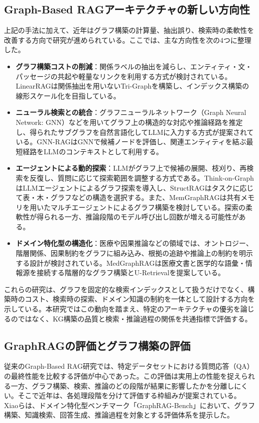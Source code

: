 \documentclass[a4j,dvipdfmx]{jsarticle}
\begin{document}
\subsection{Graph-Based RAGアーキテクチャの新しい方向性}
上記の手法に加えて、近年はグラフ構築の計算量、抽出誤り、検索時の柔軟性を改善する方向で研究が進められている\cite{pan2024unifying}。ここでは、主な方向性を次の4つに整理した。
\begin{itemize}
    \item \textbf{グラフ構築コストの削減}：関係ラベルの抽出を減らし、エンティティ・文・パッセージの共起や軽量なリンクを利用する方式が検討されている。LinearRAGは関係抽出を用いないTri-Graphを構築し、インデックス構築の線形スケール化を目指している\cite{zhuang2025linearrag}。
    \item \textbf{ニューラル検索との統合}：グラフニューラルネットワーク（Graph Neural Network: GNN）などを用いてグラフ上の構造的な対応や推論経路を推定し、得られたサブグラフを自然言語化してLLMに入力する方式が提案されている。GNN-RAGはGNNで候補ノードを評価し、関連エンティティを結ぶ最短経路をLLMのコンテキストとして利用する\cite{mavromatis2025gnnrag}。
    \item \textbf{エージェントによる動的探索}：LLMがグラフ上で候補の展開、枝刈り、再検索を反復し、質問に応じて探索範囲を調整する方式である。Think-on-GraphはLLMエージェントによるグラフ探索を導入し\cite{sun2023thinkongraph}、StructRAGはタスクに応じて表・木・グラフなどの構造を選択する\cite{li2024structrag}。また、MemGraphRAGは共有メモリを用いたマルチエージェントによるグラフ構築を検討している\cite{xiang2026memgraphrag}。探索の柔軟性が得られる一方、推論段階のモデル呼び出し回数が増える可能性がある。
    \item \textbf{ドメイン特化型の構造化}：医療や因果推論などの領域では、オントロジー、階層関係、因果制約をグラフに組み込み、根拠の追跡や推論上の制約を明示する設計が検討されている。MedGraphRAGは医療文書と医学的な語彙・情報源を接続する階層的なグラフ構築とU-Retrievalを提案している\cite{wu2024medicalgraphrag}。
\end{itemize}
これらの研究は、グラフを固定的な検索インデックスとして扱うだけでなく、構築時のコスト、検索時の探索、ドメイン知識の制約を一体として設計する方向を示している。本研究ではこの動向を踏まえ、特定のアーキテクチャの優劣を論じるのではなく、KG構築の品質と検索・推論過程の関係を共通指標で評価する。

\subsection{GraphRAGの評価とグラフ構築の評価}
従来のGraph-Based RAG研究では、特定データセットにおける質問応答（QA）の最終性能を比較する評価が中心であった。この評価は実用上の性能を捉えられる一方、グラフ構築、検索、推論のどの段階が結果に影響したかを分離しにくい。そこで近年は、各処理段階を分けて評価する枠組みが提案されている。
Xiaoら\cite{xiao2025graphragbench}は、ドメイン特化型ベンチマーク「GraphRAG-Bench」において、グラフ構築、知識検索、回答生成、推論過程を対象とする評価体系を提示した。
\end{document}
